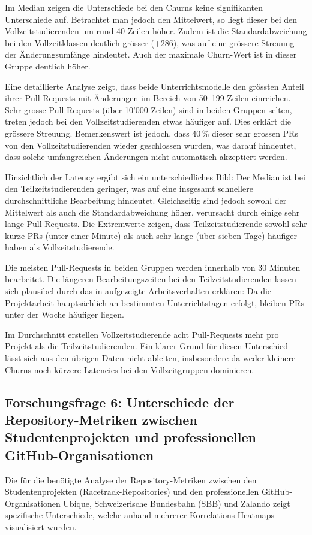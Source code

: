 Im Median zeigen die Unterschiede bei den Churns keine signifikanten Unterschiede auf. Betrachtet man jedoch den Mittelwert, so liegt dieser bei den Vollzeitstudierenden um rund 40 Zeilen höher. Zudem ist die Standardabweichung bei den Vollzeitklassen deutlich grösser (+286), was auf eine grössere Streuung der Änderungsumfänge hindeutet. Auch der maximale Churn-Wert ist in dieser Gruppe deutlich höher. 

Eine detaillierte Analyse zeigt, dass beide Unterrichtsmodelle den grössten Anteil ihrer Pull-Requests mit Änderungen im Bereich von 50–199 Zeilen einreichen. Sehr grosse Pull-Requests (über 10'000 Zeilen) sind in beiden Gruppen selten, treten jedoch bei den Vollzeitstudierenden etwas häufiger auf. Dies erklärt die grössere Streuung. Bemerkenswert ist jedoch, dass 40\,\% dieser sehr grossen PRs von den Vollzeitstudierenden wieder geschlossen wurden, was darauf hindeutet, dass solche umfangreichen Änderungen nicht automatisch akzeptiert werden.


Hinsichtlich der Latency ergibt sich ein unterschiedliches Bild: Der Median ist bei den Teilzeitstudierenden geringer, was auf eine insgesamt schnellere durchschnittliche Bearbeitung hindeutet. Gleichzeitig sind jedoch sowohl der Mittelwert als auch die Standardabweichung höher, verursacht durch einige sehr lange Pull-Requests. Die Extremwerte zeigen, dass Teilzeitstudierende sowohl sehr kurze PRs (unter einer Minute) als auch sehr lange (über sieben Tage) häufiger haben als Vollzeitstudierende.

Die meisten Pull-Requests in beiden Gruppen werden innerhalb von 30 Minuten bearbeitet. Die längeren Bearbeitungszeiten bei den Teilzeitstudierenden lassen sich plausibel durch das in  aufgezeigte Arbeitsverhalten erklären: Da die Projektarbeit hauptsächlich an bestimmten Unterrichtstagen erfolgt, bleiben PRs unter der Woche häufiger liegen.

Im Durchschnitt erstellen Vollzeitstudierende acht Pull-Requests mehr pro Projekt als die Teilzeitstudierenden. Ein klarer Grund für diesen Unterschied lässt sich aus den übrigen Daten nicht ableiten, insbesondere da weder kleinere Churns noch kürzere Latencies bei den Vollzeitgruppen dominieren. 

\subsection[Forschungsfrage 6: Unterschiede der Repository-Metriken zwischen Studentenprojekten und professionellen GitHub-Organi\linebreak sationen]{Forschungsfrage 6: Unterschiede der Repository-Metriken zwischen Studentenprojekten und professionellen GitHub-Organisationen}
Die für die  benötigte Analyse der Repository-Metriken zwischen den Studentenprojekten (Racetrack-Repositories) und den professionellen GitHub-Organisationen Ubique, Schweizerische Bundesbahn (SBB) und Zalando zeigt spezifische Unterschiede, welche anhand mehrerer Korrelations-Heatmaps visualisiert wurden. 

